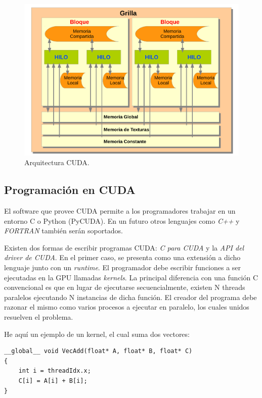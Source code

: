 \begin{figure}[h]
\begin{center}
\includegraphics[width=13cm]{figures/cuda}
\end{center}
\caption{Arquitectura CUDA.}
\label{fg:cuda}
\end{figure}


\subsection{Programación en CUDA}
El software que provee CUDA permite a los programadores trabajar en un entorno C o Python (PyCUDA).
En un futuro otros lenguajes como {\em C++} y {\em FORTRAN} tambi\'en ser\'an soportados. 

Existen dos formas de escribir programas CUDA: {\em C para CUDA} y la {\em API del driver de CUDA}.
En el primer caso, se presenta como una extensi\'on a dicho lenguaje junto con un {\em runtime}.
El programador debe escribir funciones a ser ejecutadas en la GPU llamadas {\em kernels}. 
La principal diferencia con una funci\'on C convencional es que en lugar de ejecutarse secuencialmente, existen N threads paralelos ejecutando N instancias de dicha funci\'on. 
El creador del programa debe razonar el mismo como varios procesos a ejecutar en paralelo, los cuales unidos resuelven el problema.

He aqu\'i un ejemplo de un kernel, el cual suma dos vectores:

\begin{verbatim}
__global__ void VecAdd(float* A, float* B, float* C)
{
    int i = threadIdx.x;
    C[i] = A[i] + B[i];
}
\end{verbatim}

